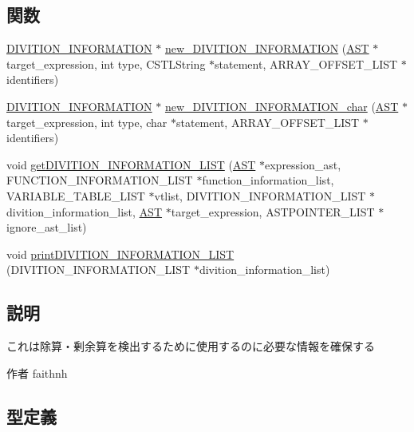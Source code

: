 \subsection*{関数}
\begin{DoxyCompactItemize}
\item 
\hyperlink{structdivition__information}{DIVITION\_\-INFORMATION} $\ast$ \hyperlink{DivitionInformation_8h_a996b130740bc8874bbac2794d27bb94c}{new\_\-DIVITION\_\-INFORMATION} (\hyperlink{structabstract__syntax__tree}{AST} $\ast$target\_\-expression, int type, CSTLString $\ast$statement, ARRAY\_\-OFFSET\_\-LIST $\ast$identifiers)
\item 
\hyperlink{structdivition__information}{DIVITION\_\-INFORMATION} $\ast$ \hyperlink{DivitionInformation_8h_a2a58708b942277980a1e342214e8a254}{new\_\-DIVITION\_\-INFORMATION\_\-char} (\hyperlink{structabstract__syntax__tree}{AST} $\ast$target\_\-expression, int type, char $\ast$statement, ARRAY\_\-OFFSET\_\-LIST $\ast$identifiers)
\item 
void \hyperlink{DivitionInformation_8h_a644b8d5eff9ed05458a1fc23e956dec2}{getDIVITION\_\-INFORMATION\_\-LIST} (\hyperlink{structabstract__syntax__tree}{AST} $\ast$expression\_\-ast, FUNCTION\_\-INFORMATION\_\-LIST $\ast$function\_\-information\_\-list, VARIABLE\_\-TABLE\_\-LIST $\ast$vtlist, DIVITION\_\-INFORMATION\_\-LIST $\ast$divition\_\-information\_\-list, \hyperlink{structabstract__syntax__tree}{AST} $\ast$target\_\-expression, ASTPOINTER\_\-LIST $\ast$ignore\_\-ast\_\-list)
\item 
void \hyperlink{DivitionInformation_8h_a74edf6ce59d5bd1990b6d76553b13380}{printDIVITION\_\-INFORMATION\_\-LIST} (DIVITION\_\-INFORMATION\_\-LIST $\ast$divition\_\-information\_\-list)
\end{DoxyCompactItemize}


\subsection{説明}
これは除算・剰余算を検出するために使用するのに必要な情報を確保する \begin{DoxyAuthor}{作者}
faithnh 
\end{DoxyAuthor}


\subsection{型定義}
